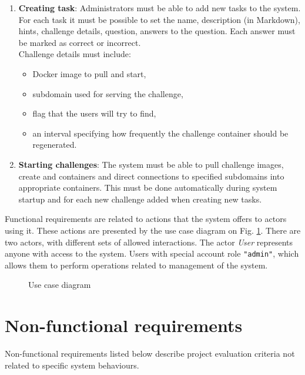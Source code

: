\begin{enumerate}
	\item \textbf{Creating task}: Administrators must be able to add new tasks to the system. For each task it must be possible to set the name, description (in Markdown), hints, challenge details, question, answers to the question. Each answer must be marked as correct or incorrect.\\
	Challenge details must include:
	\begin{itemize}
		\item Docker image to pull and start,
		\item subdomain used for serving the challenge,
		\item flag that the users will try to find,
		\item an interval specifying how frequently the challenge container should be regenerated.
	\end{itemize}

	\item \textbf{Starting challenges}: The system must be able to pull challenge images, create and containers and direct connections to specified subdomains into appropriate containers. This must be done automatically during system startup and for each new challenge added when creating new tasks.
\end{enumerate}

Functional requirements are related to actions that the system offers to actors using it. These actions are presented by the use case diagram on Fig. \ref{fig:use-case-diag}. There are two actors, with different sets of allowed interactions. The actor \textit{User} represents anyone with access to the system. Users with special account role \texttt{"admin"}, which allows them to perform operations related to management of the system.

\begin{figure}
	\centering
	
	\caption{Use case diagram}
	\label{fig:use-case-diag}
\end{figure}

\section{Non-functional requirements}

Non-functional requirements listed below describe project evaluation criteria not related to specific system behaviours.

